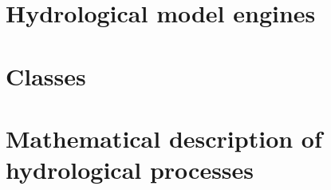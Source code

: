 \documentclass[a4paper,twocolumn,10pt,fleqn]{book}
\begin{document}

\fancyhead[LE,RO]{\bfseries\thepage}
\tableofcontents


\fancyhead[LE,RO]{\bfseries\thepage}    %
\fancyhead[RE]{\bfseries\leftmark}      %
\fancyhead[LO]{\bfseries\rightmark}     %



\onecolumn


\twocolumn
\part{Hydrological model engines} \label{part:modelEngines}


\onecolumn
\part{Classes} \label{part:classes}


\twocolumn
\part{Mathematical description of hydrological processes} \label{part:processes}








\clearpage
\fancyhead[LE,RO]{\bfseries\thepage}
\listoffigures
\end{document}
